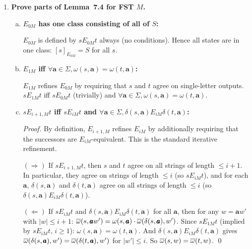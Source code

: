 \begin{enumerate}[{7.}1.]
\begin{enumerate}[(a)]
  (Follows from Lemma~7.3c: $\delta_{E_M}$ is well-defined because equivalent states are mapped to equivalent successors.)
\end{enumerate}

\item \textbf{Prove parts of Lemma~7.4 for FST $M$.}

\begin{enumerate}[(a)]
  \item \textbf{$E_{0M}$ has one class consisting of all of $S$:}

  $E_{0M}$ is defined by $s E_{0M} t$ always (no conditions).  Hence all states are in one class: $[s]_{E_{0M}}=S$ for all $s$.

  \item \textbf{$E_{1M}$ iff $\forall\pmb{a}\in\Sigma,\omega(s,\pmb{a})=\omega(t,\pmb{a})$:}

  $E_{1M}$ refines $E_{0M}$ by requiring that $s$ and $t$ agree on single-letter outputs.  $s E_{1M} t$ iff $s E_{0M} t$ (trivially) and $\forall\pmb{a}\in\Sigma,\omega(s,\pmb{a})=\omega(t,\pmb{a})$.

  \item \textbf{$s E_{i+1,M} t$ iff $s E_{iM} t$ and $\forall\pmb{a}\in\Sigma,\delta(s,\pmb{a}) E_{iM} \delta(t,\pmb{a})$:}

  \begin{proof}
  By definition, $E_{i+1,M}$ refines $E_{iM}$ by additionally requiring that the successors are $E_{iM}$-equivalent.  This is the standard iterative refinement.

  $(\Rightarrow)$ If $s E_{i+1,M} t$, then $s$ and $t$ agree on all strings of length $\le i+1$.  In particular, they agree on strings of length $\le i$ (so $s E_{iM} t$), and for each $\pmb{a}$, $\delta(s,\pmb{a})$ and $\delta(t,\pmb{a})$ agree on all strings of length $\le i$ (so $\delta(s,\pmb{a}) E_{iM} \delta(t,\pmb{a})$).

  $(\Leftarrow)$ If $s E_{iM} t$ and $\delta(s,\pmb{a}) E_{iM} \delta(t,\pmb{a})$ for all $\pmb{a}$, then for any $w=\pmb{a}w'$ with $|w|\le i+1$: $\overline{\omega}(s,\pmb{a}w')=\omega(s,\pmb{a})\cdot\overline{\omega}(\delta(s,\pmb{a}),w')$.  Since $s E_{1M} t$ (implied by $s E_{iM} t$, $i\ge 1$): $\omega(s,\pmb{a})=\omega(t,\pmb{a})$.  And $\delta(s,\pmb{a}) E_{iM} \delta(t,\pmb{a})$ gives $\overline{\omega}(\delta(s,\pmb{a}),w')=\overline{\omega}(\delta(t,\pmb{a}),w')$ for $|w'|\le i$.  So $\overline{\omega}(s,w)=\overline{\omega}(t,w)$. \qed
  \end{proof}
\end{enumerate}


\end{enumerate}
